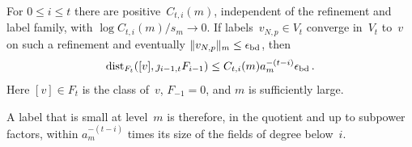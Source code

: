 \begin{lemma}\label{lem:J-graded-quotient}
For $0\le i\le t$ there are positive~$C_{t,i}(m)$, independent of the refinement and label family, with $\log C_{t,i}(m)/s_m\to0$. If labels~$v_{N,p}\in V_t$ converge in~$V_t$ to~$v$ on such a refinement and eventually $\|v_{N,p}\|_m\le\epsilon_{\rm bd}$, then
\begin{equation}\label{eq:J-graded-input}
\operatorname{dist}_{F_t}([v],\jmath_{i-1,t}F_{i-1})
\le C_{t,i}(m)a_m^{-(t-i)}\epsilon_{\rm bd}\,.
\end{equation}
Here $[v]\in F_t$ is the class of~$v$, $F_{-1}=0$, and $m$ is sufficiently large.
\end{lemma}
A label that is small at level~$m$ is therefore, in the quotient and up to subpower factors, within $a_m^{-(t-i)}$ times its size of the fields of degree below~$i$.

